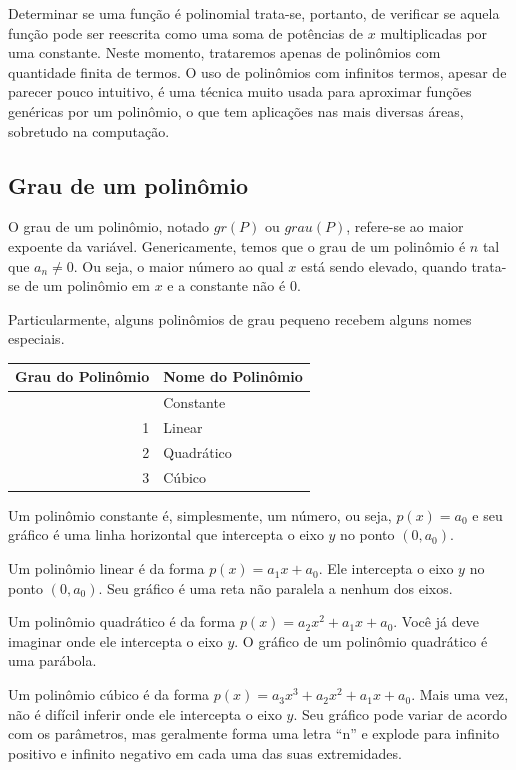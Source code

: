 \documentclass[
  letterpaper,
  DIV=11,
  numbers=noendperiod]{scrreprt}
\begin{document}
Determinar se uma função é polinomial trata-se, portanto, de verificar
se aquela função pode ser reescrita como uma soma de potências de \(x\)
multiplicadas por uma constante. Neste momento, trataremos apenas de
polinômios com quantidade finita de termos. O uso de polinômios com
infinitos termos, apesar de parecer pouco intuitivo, é uma técnica muito
usada para aproximar funções genéricas por um polinômio, o que tem
aplicações nas mais diversas áreas, sobretudo na computação.

\subsection{Grau de um polinômio}\label{grau-de-um-polinuxf4mio}

O grau de um polinômio, notado \(gr(P)\) ou \(grau(P)\), refere-se ao
maior expoente da variável. Genericamente, temos que o grau de um
polinômio é \(n\) tal que \(a_n \neq 0\). Ou seja, o maior número ao
qual \(x\) está sendo elevado, quando trata-se de um polinômio em \(x\)
e a constante não é 0.

Particularmente, alguns polinômios de grau pequeno recebem alguns nomes
especiais.

\begin{longtable}[]{@{}rl@{}}
\toprule\noalign{}
Grau do Polinômio & Nome do Polinômio \\
\midrule\noalign{}
\endhead
\bottomrule\noalign{}
\endlastfoot
0 & Constante \\
1 & Linear \\
2 & Quadrático \\
3 & Cúbico \\
\end{longtable}

Um polinômio constante é, simplesmente, um número, ou seja, \(p(x)=a_0\)
e seu gráfico é uma linha horizontal que intercepta o eixo \(y\) no
ponto \((0,a_0)\).

Um polinômio linear é da forma \(p(x) = a_1x+a_0\). Ele intercepta o
eixo \(y\) no ponto \((0,a_0)\). Seu gráfico é uma reta não paralela a
nenhum dos eixos.

Um polinômio quadrático é da forma \(p(x) = a_2x^2+a_1x+a_0\). Você já
deve imaginar onde ele intercepta o eixo \(y\). O gráfico de um
polinômio quadrático é uma parábola.

Um polinômio cúbico é da forma \(p(x) = a_3x^3+a_2x^2+a_1x+a_0\). Mais
uma vez, não é difícil inferir onde ele intercepta o eixo \(y\). Seu
gráfico pode variar de acordo com os parâmetros, mas geralmente forma
uma letra ``n'' e explode para infinito positivo e infinito negativo em
cada uma das suas extremidades.
\end{document}
